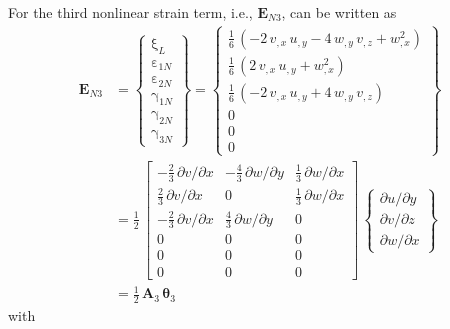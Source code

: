 For the third nonlinear strain term, i.e., $\mathbf{E}_{N3}$, can be written as
\begin{equation}
\begin{aligned}
\mathbf{E}_{N3} & =  \begin{Bmatrix}
\mathrm \xi_{L} \\
\mathrm \varepsilon_{1N} \\                    
\mathrm \varepsilon_{2N} \\           
\mathrm \gamma_{1N} \\                
\mathrm \gamma_{2N} \\                
\mathrm \gamma_{3N} \end{Bmatrix} =   
\begin{Bmatrix}                       
\tfrac{1}{6} \,  \left( - 2 \, v_{,x} \, u_{,y} - 4 \, w_{,y} \, v_{,z} +  w_{,x}^2  \right)\\
\tfrac{1}{6} \,  \left( 2 \, v_{,x} \, u_{,y}  +  w_{,x}^2  \right) \\
\tfrac{1}{6} \,  \left( - 2 \, v_{,x} \, u_{,y} + 4 \, w_{,y} \, v_{,z} \right) \\
0 \\
0 \\ 
0 \end{Bmatrix} \\
& = \frac{1}{2} \, \begin{bmatrix}
- \tfrac{2}{3} \, \partial v / \partial x &  - \tfrac{4}{3} \, \partial w / \partial y &  \tfrac{1}{3} \, \partial w / \partial x   \\
\tfrac{2}{3} \, \partial v / \partial x &  0 & \tfrac{1}{3} \, \partial w / \partial x  \\
- \tfrac{2}{3} \, \partial v / \partial x & \tfrac{4}{3} \, \partial w / \partial y & 0 \\
0 &  0 & 0  \\
0 &  0 & 0  \\
0 &  0 & 0  \end{bmatrix} \, \begin{Bmatrix}
\partial u / \partial y\\
\partial v / \partial z \\
\partial w / \partial x
\end{Bmatrix} \\
& = \tfrac{1}{2} \, \mathbf{A}_3 \, \boldsymbol{\theta}_3
\end{aligned}
\end{equation}
with  
